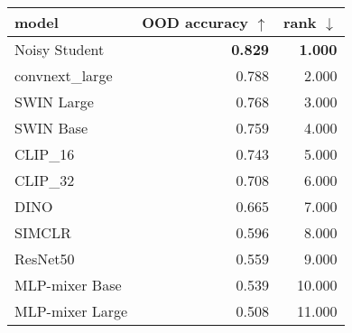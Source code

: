 \begin{tabular}{lrr}
\toprule
          model & OOD accuracy $\uparrow$ & rank $\downarrow$ \\
\midrule
  Noisy Student &          \textbf{0.829} &    \textbf{1.000} \\
convnext\_large &                   0.788 &             2.000 \\
     SWIN Large &                   0.768 &             3.000 \\
      SWIN Base &                   0.759 &             4.000 \\
       CLIP\_16 &                   0.743 &             5.000 \\
       CLIP\_32 &                   0.708 &             6.000 \\
           DINO &                   0.665 &             7.000 \\
         SIMCLR &                   0.596 &             8.000 \\
       ResNet50 &                   0.559 &             9.000 \\
 MLP-mixer Base &                   0.539 &            10.000 \\
MLP-mixer Large &                   0.508 &            11.000 \\
\bottomrule
\end{tabular}


